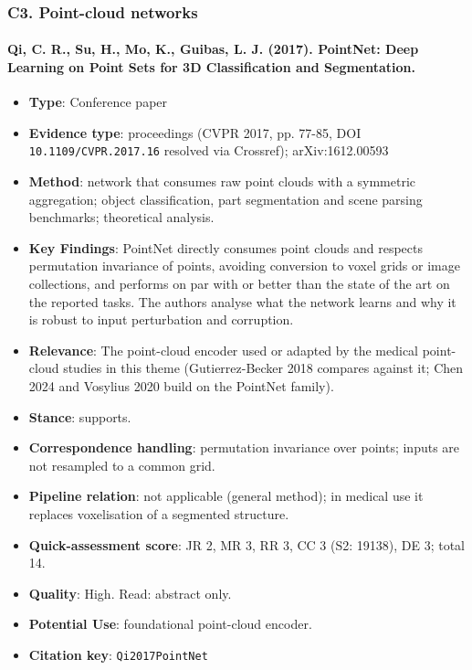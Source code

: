 \documentclass[journal,onecolumn]{IEEEtran}
\begin{document}
\subsubsection{C3. Point-cloud networks}

\paragraph{Qi, C. R., Su, H., Mo, K., Guibas, L. J. (2017). PointNet: Deep Learning on Point Sets for 3D Classification and Segmentation.~\cite{Qi2017PointNet}}\mbox{}

\begin{itemize}

\item{} \textbf{Type}: Conference paper

\item{} \textbf{Evidence type}: proceedings (CVPR 2017, pp. 77-85, DOI \nolinkurl{10.1109/CVPR.2017.16} resolved via Crossref); arXiv:1612.00593

\item{} \textbf{Method}: network that consumes raw point clouds with a symmetric aggregation; object classification, part segmentation and scene parsing benchmarks; theoretical analysis.

\item{} \textbf{Key Findings}: PointNet directly consumes point clouds and respects permutation invariance of points, avoiding conversion to voxel grids or image collections, and performs on par with or better than the state of the art on the reported tasks. The authors analyse what the network learns and why it is robust to input perturbation and corruption.

\item{} \textbf{Relevance}: The point-cloud encoder used or adapted by the medical point-cloud studies in this theme (Gutierrez-Becker 2018 compares against it; Chen 2024 and Vosylius 2020 build on the PointNet family).

\item{} \textbf{Stance}: supports.

\item{} \textbf{Correspondence handling}: permutation invariance over points; inputs are not resampled to a common grid.

\item{} \textbf{Pipeline relation}: not applicable (general method); in medical use it replaces voxelisation of a segmented structure.

\item{} \textbf{Quick-assessment score}: JR 2, MR 3, RR 3, CC 3 (S2: 19138), DE 3; total 14.

\item{} \textbf{Quality}: High. Read: abstract only.

\item{} \textbf{Potential Use}: foundational point-cloud encoder.

\item{} \textbf{Citation key}: \texttt{Qi2017PointNet}

\end{itemize}
\end{document}

